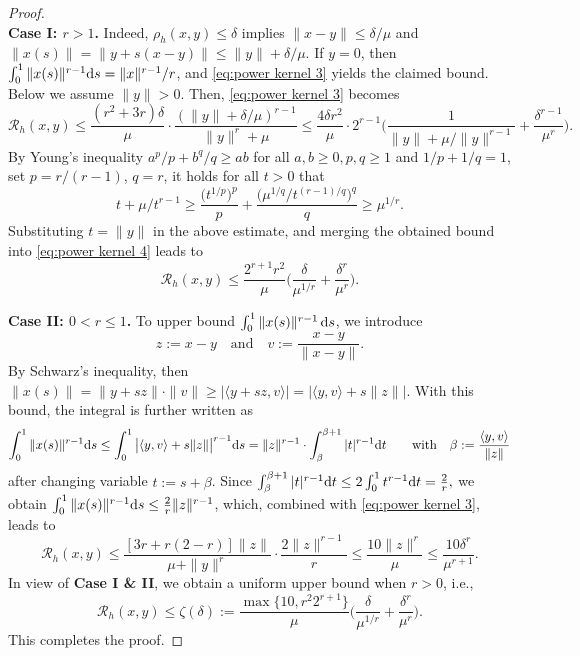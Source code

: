 \documentclass{article}
\theoremstyle{plain}
\theoremstyle{definition}
\theoremstyle{remark}
\newcommand{\cR}{\mathcal{R}}
\begin{document}
\begin{proof}
\begin{equation}
\end{equation}
\noindent %
\textbf{Case I: $r> 1$.} Indeed, $\rho_h(x,y)\leq \delta$ implies $\|x-y\| \leq \delta/\mu$ and $\|x(s)\| = \|y+s(x-y)\| \leq \|y\|+\delta/\mu$. If $y=0$, then $\int_0^1\|x(s)\|^{r-1}{\rm d}s=\|x\|^{r-1}/r$, and \eqref{eq:power kernel 3} yields the claimed bound. Below we assume $\|y\|>0$. Then, \eqref{eq:power kernel 3} becomes
\begin{equation}\label{eq:power kernel 4}
\cR_h(x,y)  \leq \frac{(r^2+3r)\delta}{\mu}\cdot \frac{(\|y\| + \delta/\mu)^{r-1}}{\|y\|^r+\mu} 
\leq \frac{4\delta r^2 }{\mu}\cdot 2^{r-1} \bigg(\frac{1}{\|y\|+\mu/\|y\|^{r-1}} + \frac{\delta^{r-1}}{\mu^r}\bigg). 
\end{equation}
By Young's inequality $a^p/p+b^q/q \geq ab$ for all $a,b\geq 0,p,q\geq 1$ and $1/p+1/q=1$, set $p=r/(r-1)$, $q=r$, it holds for all $t>0$ that 
\[
t+ \mu/t^{r-1} \geq  \frac{\big(t^{1/p}\big)^p}{p} + \frac{\big(\mu^{1/q}/t^{(r-1)/q}\big)^q}{q} \geq \mu^{1/r}.
\] 
Substituting $t=\|y\|$ in the above estimate,
and merging the obtained bound into \eqref{eq:power kernel 4} leads to $$\cR_h(x,y)  \leq \frac{2^{r+1}r^2}{\mu}\Big(\frac{\delta}{\mu^{1/r}}+\frac{\delta^r}{\mu^r}\Big).$$%



\noindent %
\textbf{Case II: $0< r\leq  1$.} To upper bound $\int_{0}^1 \|x(s)\|^{r-1} \,{\rm d}s$, we introduce
\[
z:=x-y\quad \text{and} \quad v:=\frac{x-y}{\|x-y\|}.
\]
By Schwarz's inequality, then $\|x(s)\| = \|y + sz\|\cdot \|v\| \geq | \langle y+sz,v\rangle  | = | \langle y,v\rangle + s\|z\| |$.
With this bound, the integral is further written as
\begin{equation*}
\int_{0}^1 \|x(s)\|^{r-1} {\rm d}s \leq \int_0^1 \big| \langle y,v\rangle + s\|z\| \big|^{r-1} {\rm d}s = \|z\|^{r-1} \cdot \int_{\beta}^{ \beta +1} |t|^{r-1} {\rm d}t\qquad \text{with}\quad  \beta:=\frac{\langle y,v\rangle}{\|z\|}    
\end{equation*}
after changing variable $t := s + \beta$. Since $\int_{\beta}^{ \beta +1} |t|^{r-1} {\rm d}t \leq 2\int_0^1 t^{r-1} {\rm d}t = \frac{2}{r},$ we obtain 
$
\int_{0}^1 \|x(s)\|^{r-1} {\rm d}s \leq \frac{2}{r}\|z\|^{r-1}$, 
 which, combined with \eqref{eq:power kernel 3}, leads to 
\[
\cR_h(x,y)
\leq \frac{[3r+r(2-r)]\|z\|}{\mu+\|y\|^r}\cdot\frac{2\|z\|^{r-1}}{r}
\leq \frac{10\|z\|^r}{\mu}
\leq \frac{10\delta^r}{\mu^{r+1}}.
\]
In view of \textbf{Case I \& II}, we obtain a uniform upper bound when $r>0$, i.e., \[
\cR_h(x,y) \leq \zeta(\delta):=\frac{\max\{10, r^2 2^{r+1}\}}{\mu}\Big(\frac{\delta}{\mu^{1/r}}+\frac{\delta^r}{\mu^r}\Big). \]
This completes the proof.
\end{proof}
\end{document}
